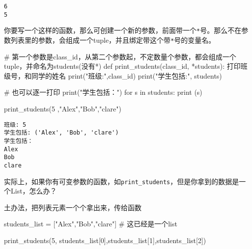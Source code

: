 \documentclass[
  letterpaper,
  DIV=11,
  numbers=noendperiod]{scrreprt}
\newenvironment{Shaded}{\begin{snugshade}}{\end{snugshade}}
\newcommand{\BuiltInTok}[1]{\textcolor[rgb]{0.00,0.23,0.31}{#1}}
\newcommand{\CommentTok}[1]{\textcolor[rgb]{0.37,0.37,0.37}{#1}}
\newcommand{\ControlFlowTok}[1]{\textcolor[rgb]{0.00,0.23,0.31}{#1}}
\newcommand{\DecValTok}[1]{\textcolor[rgb]{0.68,0.00,0.00}{#1}}
\newcommand{\KeywordTok}[1]{\textcolor[rgb]{0.00,0.23,0.31}{#1}}
\newcommand{\NormalTok}[1]{\textcolor[rgb]{0.00,0.23,0.31}{#1}}
\newcommand{\OperatorTok}[1]{\textcolor[rgb]{0.37,0.37,0.37}{#1}}
\newcommand{\StringTok}[1]{\textcolor[rgb]{0.13,0.47,0.30}{#1}}
\begin{document}
\begin{verbatim}
6
5
\end{verbatim}

你要写一个这样的函数，那么可创建一个新的参数，前面带一个\texttt{*}号。那么不在参数列表里的参数，会组成一个tuple，并且绑定带这个带\texttt{*}号的变量名。

\begin{Shaded}
\begin{Highlighting}[]
\CommentTok{\# 第一个参数是class\_id，从第二个参数起，不定数量个参数，都会组成一个tuple，并命名为\textasciigrave{}students\textasciigrave{}(没有*)}
\KeywordTok{def}\NormalTok{ print\_students(class\_id, }\OperatorTok{*}\NormalTok{students): }
    \CommentTok{\textquotesingle{}打印班级号，和同学的姓名\textquotesingle{}}
    \BuiltInTok{print}\NormalTok{(}\StringTok{"班级:"}\NormalTok{,class\_id)}
    \BuiltInTok{print}\NormalTok{(}\StringTok{"学生包括:"}\NormalTok{, students) }
    
    \CommentTok{\# 也可以逐一打印}
    \BuiltInTok{print}\NormalTok{(}\StringTok{"学生包括："}\NormalTok{)}
    \ControlFlowTok{for}\NormalTok{ s }\KeywordTok{in}\NormalTok{ students: }
        \BuiltInTok{print}\NormalTok{ (s)}

\NormalTok{print\_students(}\DecValTok{5}\NormalTok{ ,}\StringTok{"Alex"}\NormalTok{,}\StringTok{"Bob"}\NormalTok{,}\StringTok{"clare"}\NormalTok{)}
\end{Highlighting}
\end{Shaded}

\begin{verbatim}
班级: 5
学生包括: ('Alex', 'Bob', 'clare')
学生包括：
Alex
Bob
clare
\end{verbatim}

实际上，如果你有可变参数的函数，如\texttt{print\_students}，但是你拿到的数据是一个List，怎么办？

土办法，把列表元素一个个拿出来，传给函数

\begin{Shaded}
\begin{Highlighting}[]
\NormalTok{students\_list  }\OperatorTok{=}\NormalTok{ [}\StringTok{"Alex"}\NormalTok{,}\StringTok{"Bob"}\NormalTok{,}\StringTok{"clare"}\NormalTok{] }\CommentTok{\# 这已经是一个list}

\NormalTok{print\_students(}\DecValTok{5}\NormalTok{, students\_list[}\DecValTok{0}\NormalTok{],students\_list[}\DecValTok{1}\NormalTok{],students\_list[}\DecValTok{2}\NormalTok{])}
\end{Highlighting}
\end{Shaded}
\end{document}
